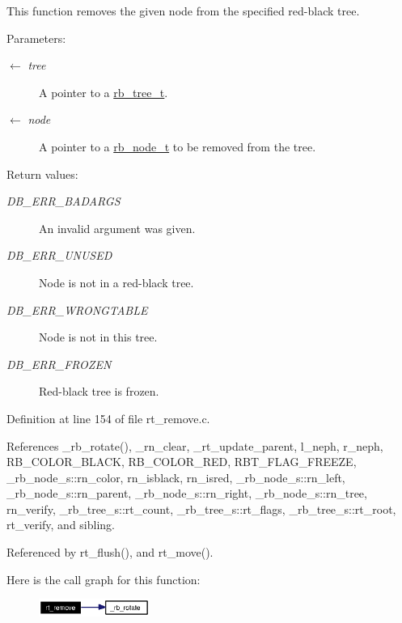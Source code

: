 This function removes the given node from the specified red-black tree.

\begin{Desc}
\item[Parameters:]
\begin{description}
\item[\mbox{$\leftarrow$} {\em tree}]A pointer to a \hyperlink{group__dbprim__rbtree_ga0}{rb\_\-tree\_\-t}. \item[\mbox{$\leftarrow$} {\em node}]A pointer to a \hyperlink{group__dbprim__rbtree_ga1}{rb\_\-node\_\-t} to be removed from the tree.\end{description}
\end{Desc}
\begin{Desc}
\item[Return values:]
\begin{description}
\item[{\em DB\_\-ERR\_\-BADARGS}]An invalid argument was given. \item[{\em DB\_\-ERR\_\-UNUSED}]Node is not in a red-black tree. \item[{\em DB\_\-ERR\_\-WRONGTABLE}]Node is not in this tree. \item[{\em DB\_\-ERR\_\-FROZEN}]Red-black tree is frozen.\end{description}
\end{Desc}


Definition at line 154 of file rt\_\-remove.c.

References \_\-rb\_\-rotate(), \_\-rn\_\-clear, \_\-rt\_\-update\_\-parent, l\_\-neph, r\_\-neph, RB\_\-COLOR\_\-BLACK, RB\_\-COLOR\_\-RED, RBT\_\-FLAG\_\-FREEZE, \_\-rb\_\-node\_\-s::rn\_\-color, rn\_\-isblack, rn\_\-isred, \_\-rb\_\-node\_\-s::rn\_\-left, \_\-rb\_\-node\_\-s::rn\_\-parent, \_\-rb\_\-node\_\-s::rn\_\-right, \_\-rb\_\-node\_\-s::rn\_\-tree, rn\_\-verify, \_\-rb\_\-tree\_\-s::rt\_\-count, \_\-rb\_\-tree\_\-s::rt\_\-flags, \_\-rb\_\-tree\_\-s::rt\_\-root, rt\_\-verify, and sibling.

Referenced by rt\_\-flush(), and rt\_\-move().

Here is the call graph for this function:\begin{figure}[H]
\begin{center}
\leavevmode
\includegraphics[width=103pt]{group__dbprim__rbtree_ga9_cgraph}
\end{center}
\end{figure}
